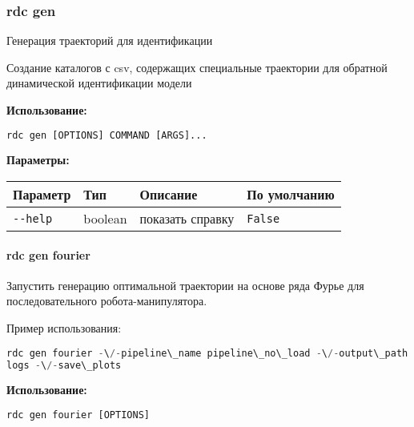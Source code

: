 \hypertarget{rdc-gen}{%
\subsubsection{rdc gen}\label{rdc-gen}}

Генерация траекторий для идентификации

Создание каталогов с csv, содержащих специальные траектории для обратной динамической идентификации модели

\textbf{Использование:}
\begin{lstlisting}[language=python, numbers=none, frame=single]
rdc gen [OPTIONS] COMMAND [ARGS]...
\end{lstlisting}

\textbf{Параметры:}
\begin{center}
\fontsize{10pt}{10pt}\selectfont
\begin{longtable}[]{p{5cm}|p{2cm}|p{3.5cm}|p{5cm}}
    \hline
\toprule()
Параметр & Тип & Описание & По умолчанию \\
\hline
\midrule()
\endhead
\texttt{-\/-help} & boolean & показать справку &
\texttt{False} \\
\bottomrule()
\hline
\end{longtable}
\end{center}

\hypertarget{rdc-gen-fourier}{%
\paragraph{rdc gen fourier}\label{rdc-gen-fourier}}

Запустить генерацию оптимальной траектории на основе ряда Фурье для последовательного робота-манипулятора.

Пример использования:
\begin{lstlisting}[language=python, numbers=none, frame=single]
rdc gen fourier -\/-pipeline\_name pipeline\_no\_load -\/-output\_path
logs -\/-save\_plots
\end{lstlisting}

\textbf{Использование:}
\begin{lstlisting}[language=python, numbers=none, frame=single]
rdc gen fourier [OPTIONS]
\end{lstlisting}

